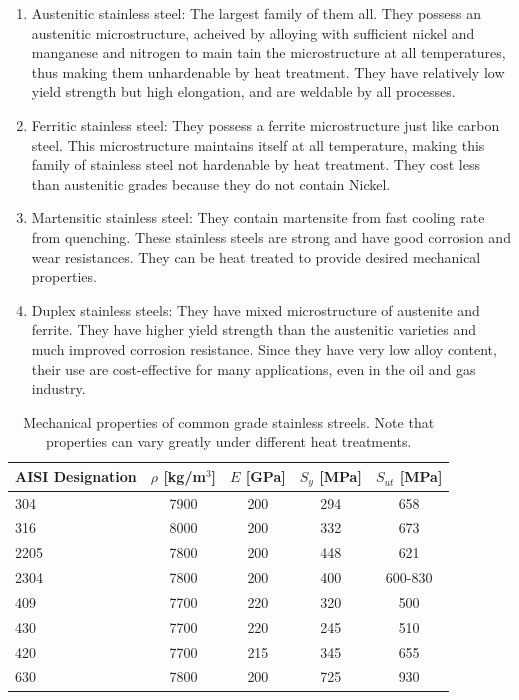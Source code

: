\documentclass[
10pt,
a4paper,
openany,
svgnames,
]{book}
\begin{document}
\begin{enumerate}
\item Austenitic stainless steel: The largest family of them all. They possess an austenitic microstructure, acheived by alloying with sufficient nickel and manganese and nitrogen to main tain the microstructure at all temperatures, thus making them unhardenable by heat treatment. They have relatively low yield strength but high elongation, and are weldable by all processes.
\item Ferritic stainless steel: They possess a ferrite microstructure just like carbon steel. This microstructure maintains itself at all temperature, making this family of stainless steel not hardenable by heat treatment. They cost less than austenitic grades because they do not contain Nickel.
\item Martensitic stainless steel: They contain martensite from fast cooling rate from quenching. These stainless steels are strong and have good corrosion and wear resistances. They can be heat treated to provide desired mechanical properties.
\item Duplex stainless steels: They have mixed microstructure of austenite and ferrite. They have higher yield strength than the austenitic varieties and much improved corrosion resistance. Since they have very low alloy content, their use are cost-effective for many applications, even in the oil and gas industry.
\end{enumerate}

\begin{table}[h]
  \centering
  \caption[Mechanical properties of common grade stainless steels]{Mechanical properties of common grade stainless streels. Note that properties can vary greatly under different heat treatments.}
  \begin{tabular}{lcccc}
    \toprule
    AISI Designation & $\rho$ [kg/m$^3$] & $E$ [GPa] & $S_y$ [MPa] & $S_{ut}$ [MPa] \\
    \midrule
    304  & 7900 & 200 & 294 & 658 \\
    316  & 8000 & 200 & 332 & 673 \\
    2205 & 7800 & 200 & 448 & 621 \\
    2304 & 7800 & 200 & 400 & 600-830 \\
    409  & 7700 & 220 & 320 & 500 \\
    430  & 7700 & 220 & 245 & 510 \\
    420  & 7700 & 215 & 345 & 655 \\
    630  & 7800 & 200 & 725 & 930 \\
    \bottomrule
  \end{tabular}
\end{table}
\end{document}
